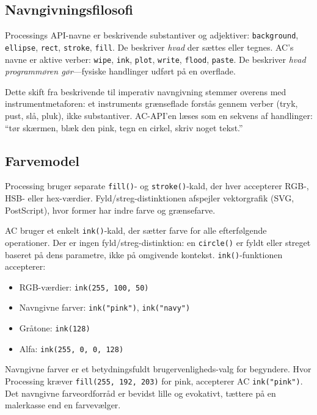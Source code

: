 \documentclass[10pt,letterpaper,twocolumn]{article}
\begin{document}
\subsection{Navngivningsfilosofi}

Processings API-navne er beskrivende substantiver og adjektiver: \texttt{background}, \texttt{ellipse}, \texttt{rect}, \texttt{stroke}, \texttt{fill}. De beskriver \emph{hvad} der sættes eller tegnes. AC's navne er aktive verber: \texttt{wipe}, \texttt{ink}, \texttt{plot}, \texttt{write}, \texttt{flood}, \texttt{paste}. De beskriver \emph{hvad programmøren gør}---fysiske handlinger udført på en overflade.

Dette skift fra beskrivende til imperativ navngivning stemmer overens med instrumentmetaforen: et instruments grænseflade forstås gennem verber (tryk, pust, slå, pluk), ikke substantiver. AC-API'en læses som en sekvens af handlinger: ``tør skærmen, blæk den pink, tegn en cirkel, skriv noget tekst.''

\subsection{Farvemodel}

Processing bruger separate \texttt{fill()}- og \texttt{stroke()}-kald, der hver accepterer RGB-, HSB- eller hex-værdier. Fyld/streg-distinktionen afspejler vektorgrafik (SVG, PostScript), hvor former har indre farve og grænsefarve.

AC bruger et enkelt \texttt{ink()}-kald, der sætter farve for alle efterfølgende operationer. Der er ingen fyld/streg-distinktion: en \texttt{circle()} er fyldt eller streget baseret på dens parametre, ikke på omgivende kontekst. \texttt{ink()}-funktionen accepterer:

\begin{itemize}
  \item RGB-værdier: \texttt{ink(255, 100, 50)}
  \item Navngivne farver: \texttt{ink("pink")}, \texttt{ink("navy")}
  \item Gråtone: \texttt{ink(128)}
  \item Alfa: \texttt{ink(255, 0, 0, 128)}
\end{itemize}

Navngivne farver er et betydningsfuldt brugervenligheds-valg for begyndere. Hvor Processing kræver \texttt{fill(255, 192, 203)} for pink, accepterer AC \texttt{ink("pink")}. Det navngivne farveordforråd er bevidst lille og evokativt, tættere på en malerkasse end en farvevælger.
\end{document}
